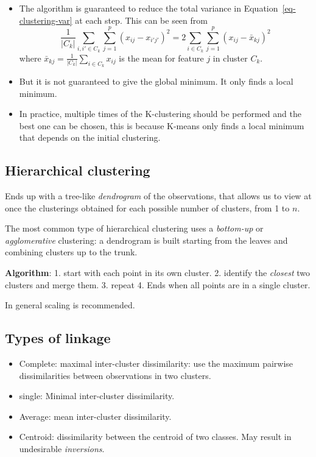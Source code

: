 \documentclass[
  letterpaper,
  DIV=11,
  numbers=noendperiod]{scrreprt}
\providecommand{\tightlist}{%
  \setlength{\itemsep}{0pt}\setlength{\parskip}{0pt}}\usepackage{longtable,booktabs,array}
\begin{document}
\begin{itemize}
\item
  The algorithm is guaranteed to reduce the total variance in
  Equation~\ref{eq-clustering-var} at each step. This can be seen from
  \[
  \frac{1}{|C_k|}\sum_{i,i'\in C_k}\sum_{j=1}^p(x_{ij}-x_{i'j'})^2=2\sum_{i\in C_k}\sum_{j=1}^p (x_{ij}-\bar{x}_{kj})^2
  \] where \(\bar{x}_{kj}=\frac{1}{|C_k|}\sum_{i\in C_k}x_{ij}\) is the
  mean for feature \(j\) in cluster \(C_k\).
\item
  But it is not guaranteed to give the global minimum. It only finds a
  local minimum.
\item
  In practice, multiple times of the K-clustering should be performed
  and the best one can be chosen, this is because K-means only finds a
  local minimum that depends on the initial clustering.
\end{itemize}

\subsection{Hierarchical clustering}\label{hierarchical-clustering}

Ends up with a tree-like \emph{dendrogram} of the observations, that
allows us to view at once the clusterings obtained for each possible
number of clusters, from 1 to \(n\).

The most common type of hierarchical clustering uses a \emph{bottom-up}
or \emph{agglomerative} clustering: a dendrogram is built starting from
the leaves and combining clusters up to the trunk.

\textbf{Algorithm}: 1. start with each point in its own cluster. 2.
identify the \emph{closest} two clusters and merge them. 3. repeat 4.
Ends when all points are in a single cluster.

In general scaling is recommended.

\subsection{Types of linkage}\label{types-of-linkage}

\begin{itemize}
\tightlist
\item
  Complete: maximal inter-cluster dissimilarity: use the maximum
  pairwise dissimilarities between observations in two clusters.
\item
  single: Minimal inter-cluster dissimilarity.
\item
  Average: mean inter-cluster dissimilarity.
\item
  Centroid: dissimilarity between the centroid of two classes. May
  result in undesirable \emph{inversions}.
\end{itemize}
\end{document}
